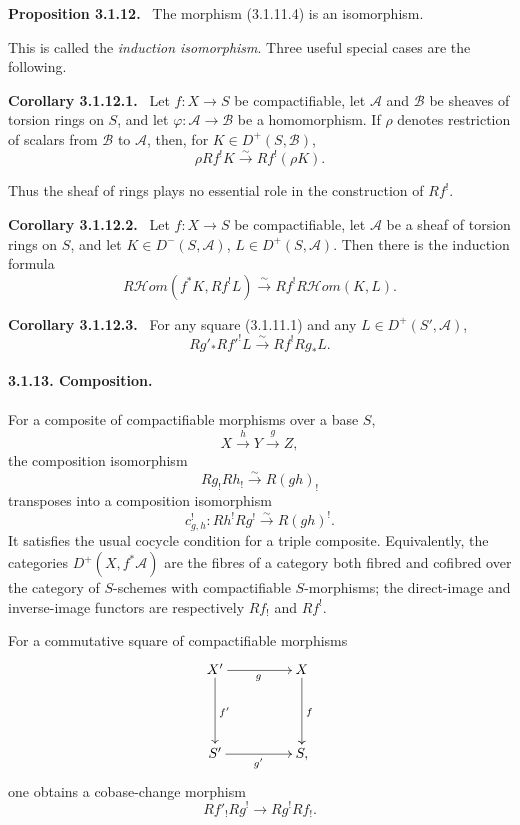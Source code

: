 \documentclass[12pt]{article}
\newcommand{\Aa}{\mathcal A}
\newcommand{\Bb}{\mathcal B}
\newcommand{\Hhom}{\mathcal{H}om}
\newenvironment{statement}[1]{\par\medskip\noindent\textbf{#1.}\ }{\par\medskip}
\begin{document}
\begin{statement}{Proposition 3.1.12}
The morphism (3.1.11.4) is an isomorphism.
\end{statement}

This is called the \emph{induction isomorphism}. Three useful special cases are the following.

\begin{statement}{Corollary 3.1.12.1}
Let $f:X\to S$ be compactifiable, let $\Aa$ and $\Bb$ be sheaves of torsion rings on $S$, and let $\varphi:\Aa\to\Bb$ be a homomorphism. If $\rho$ denotes restriction of scalars from $\Bb$ to $\Aa$, then, for $K\in D^+(S,\Bb)$,
\[
   \rho Rf^!K\xrightarrow{\sim} Rf^!(\rho K).
\]
\end{statement}

Thus the sheaf of rings plays no essential role in the construction of $Rf^!$.

\begin{statement}{Corollary 3.1.12.2}
Let $f:X\to S$ be compactifiable, let $\Aa$ be a sheaf of torsion rings on $S$, and let $K\in D^-(S,\Aa)$, $L\in D^+(S,\Aa)$. Then there is the induction formula
\[
   R\Hhom(f^*K,Rf^!L)\xrightarrow{\sim}Rf^!R\Hhom(K,L).
\]
\end{statement}

\begin{statement}{Corollary 3.1.12.3}
For any square (3.1.11.1) and any $L\in D^+(S',\Aa)$,
\[
   Rg'_*R{f'}^!L\xrightarrow{\sim}Rf^!Rg_*L.
\]
\end{statement}

\paragraph{3.1.13. Composition.}
For a composite of compactifiable morphisms over a base $S$,
\[
   X\xrightarrow{h}Y\xrightarrow{g}Z,
\]
the composition isomorphism
\[
   Rg_!Rh_!\xrightarrow{\sim}R(gh)_!
\]
transposes into a composition isomorphism
\begin{equation}
   c^!_{g,h}:Rh^!Rg^!\xrightarrow{\sim}R(gh)^!. \tag{3.1.13.1}
\end{equation}
It satisfies the usual cocycle condition for a triple composite. Equivalently, the categories $D^+(X,f^*\Aa)$ are the fibres of a category both fibred and cofibred over the category of $S$-schemes with compactifiable $S$-morphisms; the direct-image and inverse-image functors are respectively $Rf_!$ and $Rf^!$.

For a commutative square of compactifiable morphisms
\[
\xymatrix@=1.6cm{
X'\ar[r]_g\ar[d]^{f'}&X\ar[d]^f\\
S'\ar[r]_{g'}&S,
}
\]
one obtains a cobase-change morphism
\begin{equation}
   Rf'_!Rg^!\longrightarrow Rg^!Rf_!. \tag{3.1.13.2}
\end{equation}
\end{document}
